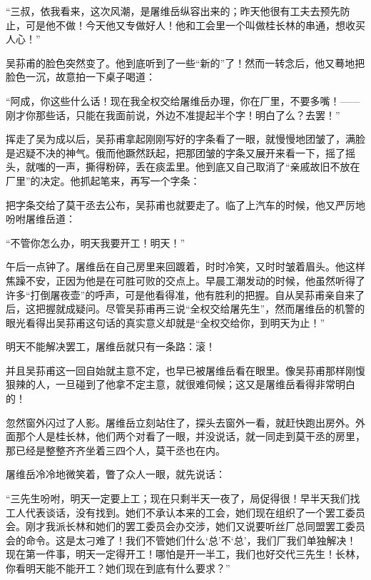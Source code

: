 \par “三叔，依我看来，这次风潮，是屠维岳纵容出来的；昨天他很有工夫去预先防止，可是他不做！今天他又专做好人！他和工会里一个叫做桂长林的串通，想收买人心！”
\par 吴荪甫的脸色突然变了。他到底听到了一些“新的”了！然而一转念后，他又蓦地把脸色一沉，故意拍一下桌子喝道：
\par “阿成，你这些什么话！现在我全权交给屠维岳办理，你在厂里，不要多嘴！——刚才你那些话，只能在我面前说，外边不准提起半个字！明白了么？去罢！”
\par 挥走了吴为成以后，吴荪甫拿起刚刚写好的字条看了一眼，就慢慢地团皱了，满脸是迟疑不决的神气。俄而他蹶然跃起，把那团皱的字条又展开来看一下，摇了摇头，就嗤的一声，撕得粉碎，丢在痰盂里。他到底又自己取消了“亲戚故旧不放在厂里”的决定。他抓起笔来，再写一个字条：
\par 把字条交给了莫干丞去公布，吴荪甫也就要走了。临了上汽车的时候，他又严厉地吩咐屠维岳道：
\par “不管你怎么办，明天我要开工！明天！”
\par 午后一点钟了。屠维岳在自己房里来回踱着，时时冷笑，又时时皱着眉头。他这样焦躁不安，正因为他是在可胜可败的交点上。早晨工潮发动的时候，他虽然听得了许多“打倒屠夜壶”的呼声，可是他看得准，他有胜利的把握。自从吴荪甫亲自来了后，这把握就成疑问。尽管吴荪甫再三说“全权交给屠先生”，然而屠维岳的机警的眼光看得出吴荪甫这句话的真实意义却就是“全权交给你，到明天为止！”
\par 明天不能解决罢工，屠维岳就只有一条路：滚！
\par 并且吴荪甫这一回自始就主意不定，也早已被屠维岳看在眼里。像吴荪甫那样刚愎狠辣的人，一旦碰到了他拿不定主意，就很难伺候；这又是屠维岳看得非常明白的！
\par 忽然窗外闪过了人影。屠维岳立刻站住了，探头去窗外一看，就赶快跑出房外。外面那个人是桂长林，他们两个对看了一眼，并没说话，就一同走到莫干丞的房里，那已经是整整齐齐坐着三四个人，莫干丞也在内。
\par 屠维岳冷冷地微笑着，瞥了众人一眼，就先说话：
\par “三先生吩咐，明天一定要上工；现在只剩半天一夜了，局促得很！早半天我们找工人代表谈话，没有找到。她们不承认本来的工会，她们现在组织了一个罢工委员会。刚才我派长林和她们的罢工委员会办交涉，她们又说要听丝厂总同盟罢工委员会的命令。这是太刁难了！我们不管她们什么‘总’不‘总’，我们厂我们单独解决！现在第一件事，明天一定得开工！哪怕是开一半工，我们也好交代三先生！长林，你看明天能不能开工？她们现在到底有什么要求？”
